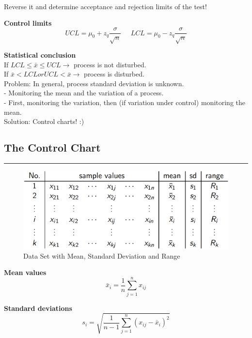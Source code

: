 Reverse it and determine acceptance and rejection limits of the test!

\textbf{Control limits}
\begin{equation}
  UCL = \mu_0 + z_q \frac{\sigma}{\sqrt{n}} \;\;\;\;\; LCL = \mu_0 - z_q \frac{\sigma}{\sqrt{n}}
\end{equation}

\textbf{Statistical conclusion}\\
If $LCL \leq \bar{x} \leq UCL \rightarrow$ process is not disturbed.\\
If $\bar{x} < LCL or UCL < \bar{x} \rightarrow$ process is disturbed.\\

Problem: In general, process standard deviation is unknown.\\
 - Monitoring the mean and the variation of a process.\\
 - First, monitoring the variation, then (if variation under control) monitoring the mean.\\

Solution: Control charts! :)


\subsection{The Control Chart}
\noindent\rule[\linienAbstand]{\linewidth}{\linienDicke}
\begin{figure}[H]
  \centering
  \includegraphics[width = 0.8\linewidth]{Pics/2.1.png}
  \caption{Data Set with Mean, Standard Deviation and Range}
  \label{2.1}
\end{figure}

\textbf{Mean values}
\begin{equation}
  \bar{x}_i = \frac{1}{n} \sum_{j=1}^n x_{ij}
\end{equation}

\textbf{Standard deviations}
\begin{equation}
  s_i = \sqrt{\frac{1}{n-1} \sum_{j=1}^n \left(x_{ij} - \bar{x}_i\right)^2}
\end{equation}

